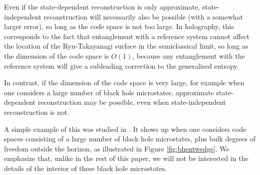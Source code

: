 \documentclass[12pt]{article}
\begin{document}

Even if the state-dependent reconstruction is only approximate,
state-independent reconstruction will necessarily also be possible (with a somewhat larger error), so long as the code space is not too large. In holography, this corresponds to the fact that entanglement with a reference system cannot affect the location of the Ryu-Takayanagi surface in the semiclassical limit, so long as the dimension of the code space is $O(1)$, because any entanglement with the reference system will give a subleading correction to the generalised entropy.

In contrast, if the dimension of the code space is very large, for example when one considers a large number of black hole microstates, approximate state-dependent reconstruction may be possible, even when state-independent reconstruction is not.

A simple example of this was studied in \cite{hayden2018learning}. It shows up when one considers code spaces consisting of a large number of black hole microstates, plus bulk degrees of freedom outside the horizon, as illustrated in Figure \ref{fig:bhentwedge}. We emphasize that, unlike in the rest of this paper, we will not be interested in the details of the interior of these black hole microstates.
\end{document}
